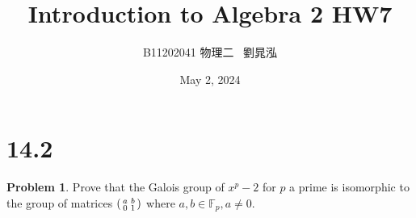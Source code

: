\documentclass{article}
\title{Introduction to Algebra 2 HW7}
\author{B11202041 物理二 \, 劉晁泓}
\date{May 2, 2024}
\theoremstyle{definition}
\newtheorem{prob}{Problem}
\newcommand{\FF}{\mathbb F}
\begin{document}
\maketitle
\thispagestyle{fancy}
\renewcommand{\footrulewidth}{0.4pt}
\cfoot{\thepage}
\renewcommand{\headrulewidth}{0.4pt}

\section*{14.2}

\setcounter{prob}{4}
\begin{prob}
	Prove that the Galois group of $x^p - 2$ for $p$ a prime is isomorphic to the group of matrices $\begin{psmallmatrix} a & b\\ 0 & 1 \end{psmallmatrix}$ where $a, b \in \FF_p, a \neq 0$.
\end{prob}
\end{document}
